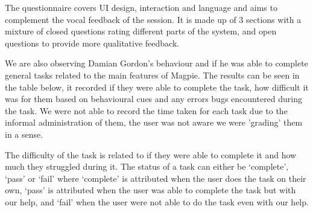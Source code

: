 \newpage{}

The questionnaire covers UI design, interaction and language and aims to
complement the vocal feedback of the session. It is made up of 3 sections with a
mixture of closed questions rating different parts of the system, and open
questions to provide more qualitative feedback.

We are also observing Damian Gordon's behaviour and if he was able to complete
general tasks related to the main features of Magpie. The results can be seen in
the table below, it recorded if they were able to complete the task, how
difficult it was for them based on behavioural cues and any errors bugs
encountered during the task. We were not able to record the time taken for each
task due to the informal administration of them, the user was not aware we were
'grading' them in a sense.

\noindent The difficulty of the task is related to if they were able to complete
it and how much they struggled during it. The status of a task can either be
`complete', `pass' or `fail' where `complete' is attributed when the user does
the task on their own, `pass' is attributed when the user was able to complete
the task but with our help, and `fail' when the user were not able to do the
task even with our help. 

